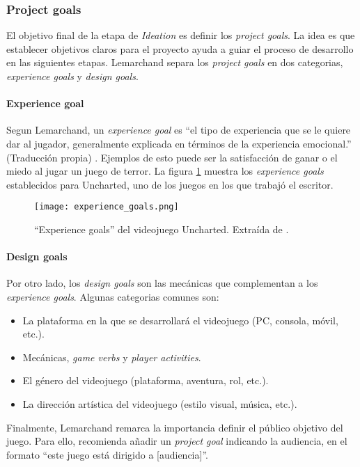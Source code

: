 \subsubsection{Project goals}
\par El objetivo final de la etapa de \textit{Ideation} es definir los \textit{project goals}. La idea es que establecer objetivos claros para el proyecto ayuda a guiar el proceso de desarrollo en las siguientes etapas. Lemarchand separa los \textit{project goals} en dos categorias, \textit{experience goals} y \textit{design goals}. 
\bigbreak
\paragraph{Experience goal} Segun Lemarchand, un \textit{experience goal} es ``el tipo de experiencia que se le quiere dar al jugador, generalmente explicada en términos de la experiencia emocional.'' (Traducción propia) \cite{lemarchandPlayfulProductionProcess2021}. Ejemplos de esto puede ser la satisfacción de ganar o el miedo al jugar un juego de terror. La figura \ref{fig:x ejemplo de experience goals Lemarchand} muestra los \textit{experience goals} establecidos para Uncharted, uno de los juegos en los que trabajó el escritor.
%
\begin{figure}[H]
    \centering
    \texttt{[image: experience\_goals.png]}
    \caption{``Experience goals'' del videojuego Uncharted. Extraída de \cite{lemarchandPlayfulProductionProcess2021}.}
    \label{fig:x ejemplo de experience goals Lemarchand}
\end{figure} 
%
\paragraph{Design goals} Por otro lado, los \textit{design goals} son las mecánicas que complementan a los \textit{experience goals}. Algunas categorias comunes son:
\begin{itemize}
    \item La plataforma en la que se desarrollará el videojuego (PC, consola, móvil, etc.).
    \item Mecánicas, \textit{game verbs} y \textit{player activities}.
    \item El género del videojuego (plataforma, aventura, rol, etc.).
    \item La dirección artística del videojuego (estilo visual, música, etc.).
\end{itemize}
\par Finalmente, Lemarchand remarca la importancia definir el público objetivo del juego. Para ello, recomienda añadir un \textit{project goal} indicando la audiencia, en el formato ``este juego está dirigido a [audiencia]''.
%
%
%
